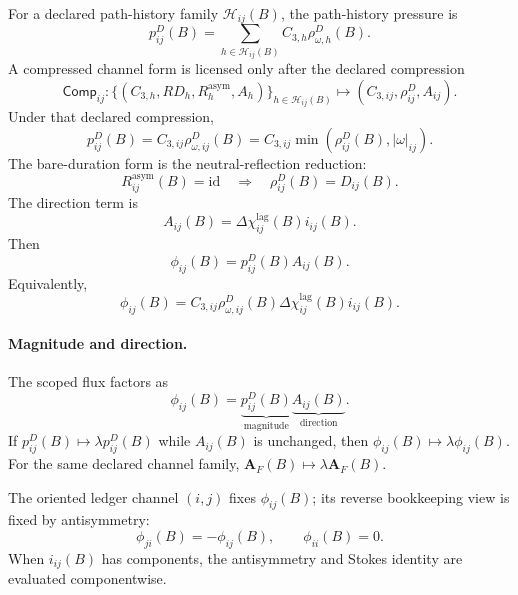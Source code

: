 For a declared path-history family \(\mathcal H_{ij}(B)\), the path-history pressure is
\begin{equation}
p^D_{ij}(B)
=
\sum_{h\in\mathcal H_{ij}(B)}
C_{3,h}\rho^D_{\omega,h}(B).
\label{eq:path-history-pressure}
\end{equation}
A compressed channel form is licensed only after the declared compression
\begin{equation}
\mathsf{Comp}_{ij}:
\{(C_{3,h},RD_h,R^{\mathrm{asym}}_h,A_h)\}_{h\in\mathcal H_{ij}(B)}
\mapsto
(C_{3,ij},\rho^D_{ij},A_{ij}).
\label{eq:path-history-compression}
\end{equation}
Under that declared compression,
\begin{equation}
p^D_{ij}(B)=C_{3,ij}\rho^D_{\omega,ij}(B)
=
C_{3,ij}\min\!\left(\rho^D_{ij}(B),|\omega|_{ij}\right).
\label{eq:b-scoped-channel-pressure}
\end{equation}
The bare-duration form is the neutral-reflection reduction:
\[
R^{\mathrm{asym}}_{ij}(B)=\mathrm{id}
\quad\Rightarrow\quad
\rho^D_{ij}(B)=D_{ij}(B).
\]
The direction term is
\begin{equation}
A_{ij}(B)=\Delta\chi^{\mathrm{lag}}_{ij}(B)i_{ij}(B).
\label{eq:b-scoped-channel-attention}
\end{equation}
Then
\begin{equation}
\phi_{ij}(B)=p^D_{ij}(B)A_{ij}(B).
\label{eq:b-scoped-flux}
\end{equation}
Equivalently,
\begin{equation}
\phi_{ij}(B)=
C_{3,ij}\rho^D_{\omega,ij}(B)
\Delta\chi^{\mathrm{lag}}_{ij}(B)i_{ij}(B).
\label{eq:b-scoped-flux-expanded}
\end{equation}
\paragraph{Magnitude and direction.}
The scoped flux factors as
\[
\phi_{ij}(B)=\underbrace{p^D_{ij}(B)}_{\mathrm{magnitude}}
\underbrace{A_{ij}(B)}_{\mathrm{direction}}.
\]
If \(p^D_{ij}(B)\mapsto\lambda p^D_{ij}(B)\) while \(A_{ij}(B)\) is unchanged, then \(\phi_{ij}(B)\mapsto\lambda\phi_{ij}(B)\). For the same declared channel family, \(\mathbf A_F(B)\mapsto\lambda\mathbf A_F(B)\).

The oriented ledger channel \((i,j)\) fixes \(\phi_{ij}(B)\); its reverse bookkeeping view is fixed by antisymmetry:
\begin{equation}
\phi_{ji}(B)=-\phi_{ij}(B),
\qquad
\phi_{ii}(B)=0.
\label{eq:b-scoped-flux-antisymmetry}
\end{equation}
When \(i_{ij}(B)\) has components, the antisymmetry and Stokes identity are evaluated componentwise.

